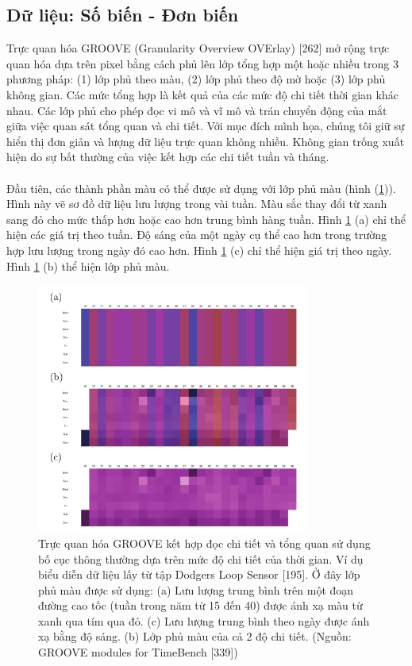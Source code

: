 \subsection{Dữ liệu: Số biến - Đơn biến}
Trực quan hóa GROOVE (Granularity Overview OVErlay) [262] mở rộng trực quan hóa dựa trên pixel bằng cách phủ lên lớp tổng hợp một hoặc nhiều trong 3 phương pháp: (1) lớp phủ theo màu, (2) lớp phủ theo độ mờ hoặc (3) lớp phủ không gian. Các mức tổng hợp là kết quả của các mức độ chi tiết thời gian khác nhau. Các lớp phủ cho phép đọc vi mô và vĩ mô và trán chuyển động của mắt giữa việc quan sát tổng quan và chi tiết. Với mục đích mình họa, chúng tôi giữ sự hiển thị đơn giản và lượng dữ liệu trực quan không nhiều. Không gian trống xuất hiện do sự bất thường của việc kết hợp các chi tiết tuần và tháng. 
\\ \\
Đầu tiên, các thành phần màu có thể được sử dụng với lớp phủ màu (hình (\ref{fig:f7.5})). Hình này vẽ sơ đồ dữ liệu lưu lượng trong vài tuần. Màu sắc thay đổi từ xanh sang đỏ cho mức thấp hơn hoặc cao hơn trung bình hàng tuần. Hình \ref{fig:f7.5} (a) chỉ thể hiện các giá trị theo tuần. Độ sáng của một ngày cụ thể cao hơn trong trường hợp lưu lượng trong ngày đó cao hơn. Hình \ref{fig:f7.5} (c) chỉ thể hiện giá trị theo ngày. Hình \ref{fig:f7.5} (b) thể hiện lớp phủ màu.
\begin{figure}[H] %
    \centering %
    \includegraphics[width=0.8\textwidth]{assets/fig_7_5.png} 
    \caption{Trực quan hóa GROOVE kết hợp đọc chi tiết và tổng quan sử dụng bố cục thông thường dựa trên mức độ chi tiết của thời gian. Ví dụ biểu diễn dữ liệu lấy từ tập Dodgers Loop Sensor [195]. Ở đây lớp phủ màu được sử dụng: (a) Lưu lượng trung bình trên một đoạn đường cao tốc (tuần trong năm từ 15 đến 40) được ánh xạ màu từ xanh qua tím qua đỏ. (c) Lưu lượng trung bình theo ngày được ánh xạ bằng độ sáng. (b) Lớp phủ màu của cả 2 độ chi tiết. (Nguồn: GROOVE modules for TimeBench [339])} %
    \label{fig:f7.5}
\end{figure}
